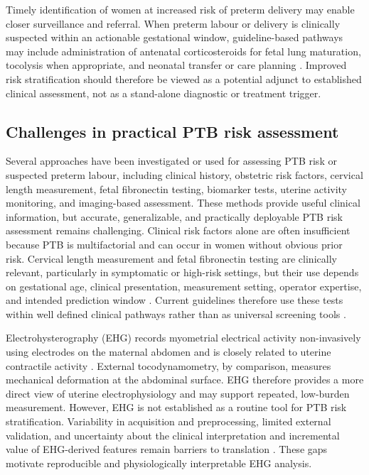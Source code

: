 \documentclass[10pt,letterpaper]{article}
\begin{document}
Timely identification of women at increased risk of preterm delivery may enable closer surveillance and referral. When preterm labour or delivery is clinically suspected within an actionable gestational window, guideline-based pathways may include administration of antenatal corticosteroids for fetal lung maturation, tocolysis when appropriate, and neonatal transfer or care planning \cite{who2022tocolytic,ACOG2017_corticosteroids,NICE_NG25}. Improved risk stratification should therefore be viewed as a potential adjunct to established clinical assessment, not as a stand-alone diagnostic or treatment trigger.

\subsection*{Challenges in practical PTB risk assessment}

Several approaches have been investigated or used for assessing PTB risk or suspected preterm labour, including clinical history, obstetric risk factors, cervical length measurement, fetal fibronectin testing, biomarker tests, uterine activity monitoring, and imaging-based assessment. These methods provide useful clinical information, but accurate, generalizable, and practically deployable PTB risk assessment remains challenging. Clinical risk factors alone are often insufficient because PTB is multifactorial and can occur in women without obvious prior risk. Cervical length measurement and fetal fibronectin testing are clinically relevant, particularly in symptomatic or high-risk settings, but their use depends on gestational age, clinical presentation, measurement setting, operator expertise, and intended prediction window \cite{NICE_NG25,SonMiller2017}. 
Current guidelines therefore use these tests within well defined clinical pathways rather than as universal screening tools \cite{NICE_NG25}.

Electrohysterography (EHG) records myometrial electrical activity non-invasively using electrodes on the maternal abdomen and is closely related to uterine contractile activity \cite{GarfieldManer2007,Lucovnik2011,Buhimschi1997}. External tocodynamometry, by comparison, measures mechanical deformation at the abdominal surface. EHG therefore provides a more direct view of uterine electrophysiology and may support repeated, low-burden measurement. However, EHG is not established as a routine tool for PTB risk stratification. Variability in acquisition and preprocessing, limited external validation, and uncertainty about the clinical interpretation and incremental value of EHG-derived features remain barriers to translation \cite{GarciaCasado2018_EHGReview}. These gaps motivate reproducible and physiologically interpretable EHG analysis.
\end{document}
